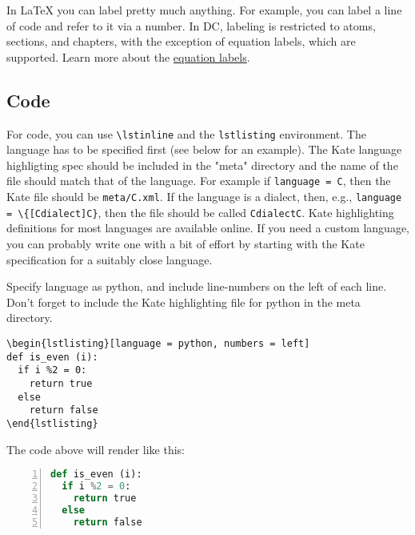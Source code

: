 \begin{gram}[Limitations]
In LaTeX you can label pretty much anything. 
%
For example, you can label a line of code and refer to it via a number.
%
In DC, labeling is restricted to atoms, sections, and chapters, with the exception of equation labels, which are supported.
%
Learn more about the 
\href{sec:dc::typesetting-mathematics}{equation labels}.

\end{gram}

\subsection{Code}
\label{sec:mtl::code}
For code, you can use \lstinline`\lstinline` and the \lstinline`lstlisting` environment.  The language has to be specified first (see below for an example).  The Kate language highligting spec should be included in the "meta" directory and the name of the file should match that of the language.  For example if \lstinline`language = C`, then the Kate file should be \lstinline`meta/C.xml`.  If the language is a dialect, then, e.g., \lstinline`language = \{[Cdialect]C}`, then the file should be called \lstinline`CdialectC`.  
%
Kate highlighting definitions for most languages are available online.
%
If you need a custom language, you can probably write one with a bit of effort by starting with the Kate specification for a  suitably close language.

\begin{flex}
\begin{example}
Specify language as python, and include  line-numbers on the left of each line.
Don't forget to include the Kate highlighting file for python in the meta directory.

\begin{verbatim}
\begin{lstlisting}[language = python, numbers = left]
def is_even (i):
  if i %2 = 0:
    return true
  else 
    return false
\end{lstlisting}
\end{verbatim}
\end{example}

The code above will render like this:
%
\begin{lstlisting}[language = python, numbers = left]
def is_even (i):
  if i %2 = 0:
    return true
  else 
    return false
\end{lstlisting}
\end{flex}


